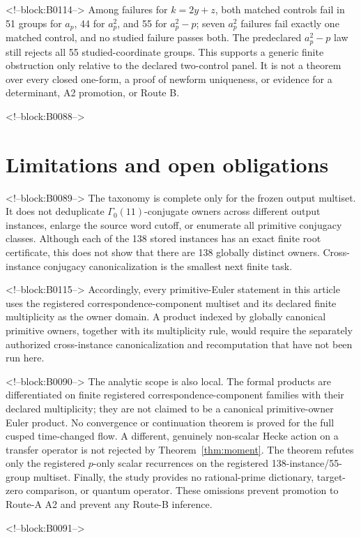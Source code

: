 \documentclass[11pt]{article}
\theoremstyle{definition}
\theoremstyle{remark}
\newcommand{\G}{\Gamma_0(11)}
\begin{document}
<!--block:B0114-->
Among failures for $k=2y+z$, both matched controls fail in 51 groups for $a_p$, 44 for $a_p^2$, and 55 for $a_p^2-p$; seven $a_p^2$ failures fail exactly one matched control, and no studied failure passes both. The predeclared $a_p^2-p$ law still rejects all 55 studied-coordinate groups. This supports a generic finite obstruction only relative to the declared two-control panel. It is not a theorem over every closed one-form, a proof of newform uniqueness, or evidence for a determinant, A2 promotion, or Route B.

<!--block:B0088-->
\section{Limitations and open obligations}

<!--block:B0089-->
The taxonomy is complete only for the frozen output multiset. It does not deduplicate $\G$-conjugate owners across different output instances, enlarge the source word cutoff, or enumerate all primitive conjugacy classes. Although each of the 138 stored instances has an exact finite root certificate, this does not show that there are 138 globally distinct owners. Cross-instance conjugacy canonicalization is the smallest next finite task.

<!--block:B0115-->
Accordingly, every primitive-Euler statement in this article uses the registered correspondence-component multiset and its declared finite multiplicity as the owner domain. A product indexed by globally canonical primitive owners, together with its multiplicity rule, would require the separately authorized cross-instance canonicalization and recomputation that have not been run here.

<!--block:B0090-->
The analytic scope is also local. The formal products are differentiated on finite registered correspondence-component families with their declared multiplicity; they are not claimed to be a canonical primitive-owner Euler product. No convergence or continuation theorem is proved for the full cusped time-changed flow. A different, genuinely non-scalar Hecke action on a transfer operator is not rejected by Theorem~\ref{thm:moment}. The theorem refutes only the registered $p$-only scalar recurrences on the registered 138-instance/55-group multiset. Finally, the study provides no rational-prime dictionary, target-zero comparison, or quantum operator. These omissions prevent promotion to Route-A A2 and prevent any Route-B inference.

<!--block:B0091-->
\end{document}
